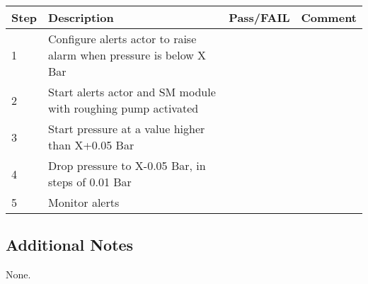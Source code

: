 \begin{table}[H]
    \begin{tabular}{|l| p{5cm} |l| p{5cm} |}
    \hline
    {\bf Step} & {\bf Description} & {\bf Pass/FAIL} & {\bf Comment}  \\ \hline
    1 & Configure alerts actor to raise alarm when pressure is below X Bar &  &  \\ \hline
    2 & Start alerts actor and SM module with roughing pump activated &  & \\ \hline
    3 & Start pressure at a value higher than X+0.05 Bar &  & \\ \hline
    4 & Drop pressure to X-0.05 Bar, in steps of 0.01 Bar &  & \\ \hline
    5 & Monitor alerts &  & \\ \hline
    \end{tabular}
\end{table}

\subsection{Additional Notes}

None.
